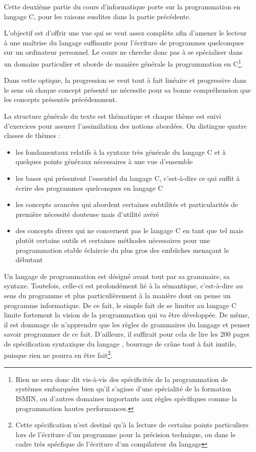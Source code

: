 \documentclass[../../main.tex]{subfiles}
\begin{document}
Cette deuxième partie du cours d'informatique porte sur la programmation en langage C, pour les raisons susdites dans la partie précédente.
 
L'objectif est d'offrir une vue qui se veut assez complète afin d'amener le lecteur à une maîtrise du langage suffisante pour l'écriture de programmes quelconques sur un ordinateur personnel. Le cours ne cherche donc pas à se spécialiser dans un domaine particulier et aborde de manière générale la programmation en C\footnote{Rien ne sera donc dit vis-à-vis des spécificités de la programmation de systèmes embarquées bien qu'il s'agisse d'une spécialité de la formation ISMIN, ou d'autres domaines importants aux règles spécifiques comme la programmation hautes performances.}.
 
Dans cette optique, la progression se veut tout à fait linéaire et progressive dans le sens où chaque concept présenté ne nécessite pour sa bonne compréhension que les concepts présentés précédemment.
 
La structure générale du texte est thématique et chaque thème est suivi d'exercices pour assurer l'assimilation des notions abordées. On distingue quatre classes de thèmes :
\begin{itemize}
	\item les fondamentaux relatifs à la syntaxe très générale du langage C et à quelques points généraux nécessaires à une vue d'ensemble
	\item les bases qui présentent l'essentiel du langage C, c'est-à-dire ce qui suffit à écrire des programmes quelconques en langage C
	\item les concepts avancées qui abordent certaines subtilités et particularités de première nécessité douteuse mais d'utilité avéré
	\item des concepts divers qui ne concernent pas le langage C en tant que tel mais plutôt certains outils et certaines méthodes nécessaires pour une programmation stable éclaircie du plus gros des embûches menaçant le débutant 
\end{itemize}
Un langage de programmation est désigné avant tout par sa grammaire, sa syntaxe. Toutefois, celle-ci est profondément lié à la sémantique, c'est-à-dire au sens du programme et plus particulièrement à la manière dont on pense un programme informatique. De ce fait, le simple fait de se limiter au langage C limite fortement la vision de la programmation qui va être développée. De même, il est dommage de n'apprendre que les règles de grammaires du langage et penser savoir programmer de ce fait. D'ailleurs, il suffirait pour cela de lire les 200 pages de spécification syntaxique du langage \cite{c11}, bourrage de crâne tout à fait inutile, puisque rien ne pourra en être fait\footnote{Cette spécification n'est destiné qu'à la lecture de certains points particuliers lors de l'écriture d'un programme pour la précision technique, ou dans le cadre très spécfique de l'écriture d'un compilateur du langage}.
\end{document}
